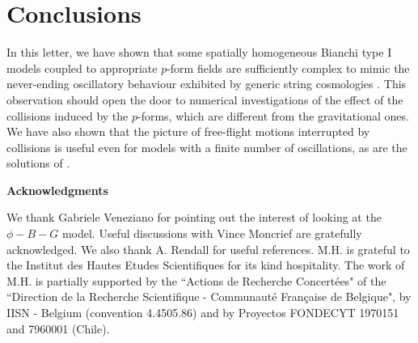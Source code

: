 \documentclass[a4paper,12pt]{article}
\begin{document}
\section{Conclusions}
In this letter, we have shown that some spatially homogeneous
Bianchi type I models coupled to appropriate $p$-form fields are
sufficiently complex to mimic the never-ending oscillatory behaviour
exhibited by generic string cosmologies \cite{dh1}.  This observation
 should open the door to numerical investigations of the effect
of the collisions induced by
the $p$-forms, which are different from the gravitational ones.  
We have also shown that the picture of free-flight motions
interrupted by collisions is useful even for models with a finite
number of oscillations, as are the solutions of \cite{MV}.

\bigskip

\centerline{\bf Acknowledgments} 

\medskip

We thank Gabriele Veneziano for pointing out the interest of looking at 
the $\phi-B-G$ model. Useful discussions with Vince Moncrief are 
gratefully acknowledged. We also thank A. Rendall for useful references.
M.H. is grateful to the Institut des Hautes Etudes
Scientifiques for its kind hospitality. 
The work of M.H. is partially supported by the ``Actions de
Recherche Concert{\'e}es" of the ``Direction de la Recherche
Scientifique - Communaut{\'e} Fran{\c c}aise de Belgique", by
IISN - Belgium (convention 4.4505.86) and by
Proyectos FONDECYT 1970151 and 7960001 (Chile).   
\end{document}
